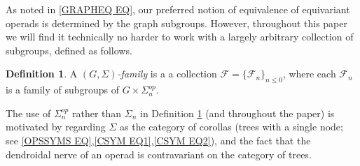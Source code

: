\documentclass[a4paper,10pt
]{article}%
\numberwithin{equation}{section}
\numberwithin{figure}{section}
\theoremstyle{definition} %
\newtheorem{definition}[equation]{Definition}%
\newcommand{\1}{\ensuremath{\mathbbm 1}}%
\begin{document}
As noted in \eqref{GRAPHEQ EQ},
our preferred notion of equivalence of equivariant operads is determined by the graph subgroups.
However, throughout this paper we will find it technically 
no harder to work with a largely arbitrary collection of subgroups,
defined as follows.


\begin{definition}\label{FAM1ST DEF}
	A \emph{$(G,\Sigma)$-family} is a
	a collection
	$\mathcal{F} = \{\mathcal{F}_n\}_{n \leq 0}$,
	where each $\mathcal{F}_n$
	is a family of subgroups of $G \times \Sigma_n^{op}$.
\end{definition}

The use of $\Sigma_n^{op}$ rather than $\Sigma_n$
in Definition \ref{FAM1ST DEF} 
(and throughout the paper) 
is motivated by regarding $\Sigma$
as the category of corollas (trees with a single node; 
see \eqref{OPSSYMS EQ},\eqref{CSYM EQ1},\eqref{CSYM EQ2}),
and the fact that the dendroidal nerve \cite[\S 1]{MW07} of an operad is contravariant on the category of trees.


\end{document}
